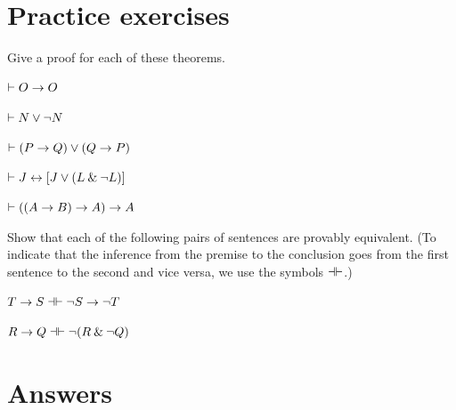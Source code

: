 
\section{Practice exercises}
\setcounter{ProbPart}{0}


\problempart
Give a proof for each of these theorems.
\begin{earg}
\item $\vdash O \rightarrow O$\smallskip
\item $\vdash N \vee {\neg} N$\smallskip
\item $\vdash (P \rightarrow Q) \vee (Q \rightarrow P)$\smallskip
\item $\vdash J \leftrightarrow [J\vee (L\mathbin{\&}{\neg} L)]$\smallskip
\item $\vdash ((A \rightarrow B) \rightarrow A) \rightarrow A$\smallskip 
\end{earg}


\problempart
Show that each of the following pairs of sentences are provably equivalent. (To indicate that the inference from the premise to the conclusion goes from the first sentence to the second and vice versa, we use the symbols $\dashv\vdash$.)
\begin{earg}
\item $T\rightarrow S \dashv\vdash {\neg} S \rightarrow {\neg} T$
\item $R \rightarrow Q \dashv\vdash {\neg}(R \mathbin{\&} {\neg} Q)$
\end{earg}



\section{Answers}
\setcounter{ProbPart}{0}


